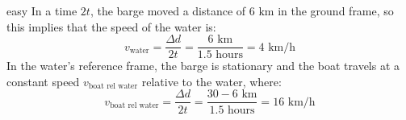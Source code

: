 \begin{solution}{easy}
In a time $2t$, the barge moved a distance of $6 \text{ km}$ in the ground frame, so this implies that the speed of the water is:
$$v_\text{water} = \frac{\Delta d}{2t} = \frac{6 \text{ km}}{1.5 \text{ hours}} = \boxed{4 \text{ km/h}}$$
In the water's reference frame, the barge is stationary and the boat travels at a constant speed $v_\text{boat rel water}$ relative to the water, where:
$$v_\text{boat rel water}= \frac{\Delta d}{2t} = \frac{30-6 \text{ km}}{1.5 \text{ hours}} = \boxed{16 \text{ km/h}}$$
\end{solution}